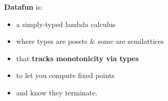 \documentclass{beamer}
\newcommand{\m}[1]{\ensuremath{\mathbf{#1}}}
\newcommand{\ms}{\mathsf}
\begin{document}

\begin{frame}

  \Large \textbf{Datafun} is:
  \begin{itemize}
  \item a simply-typed lambda calculus
  \item where types are posets \& some are semilattices
  \item that \textbf{tracks monotonicity via types}
  \item to let you compute fixed points
  \item and know they terminate.
  \end{itemize}
\end{frame}







\end{document}
